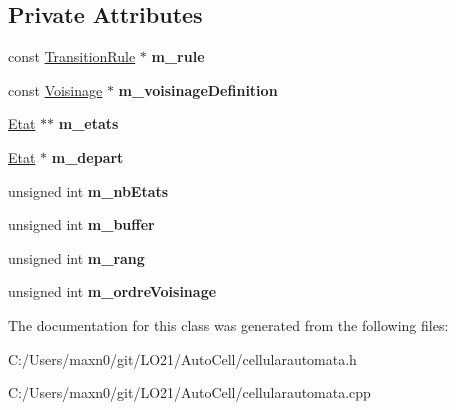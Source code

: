 \subsection*{Private Attributes}
\begin{DoxyCompactItemize}
\item 
\mbox{\label{class_cellular_automata_aac41608d613ea2ee9df3a55ad0a127f6}} 
const \mbox{\hyperlink{class_transition_rule}{Transition\+Rule}} $\ast$ {\bfseries m\+\_\+rule}
\item 
\mbox{\label{class_cellular_automata_a6990374e6bca2e228ff82ad5a3419833}} 
const \mbox{\hyperlink{class_voisinage}{Voisinage}} $\ast$ {\bfseries m\+\_\+voisinage\+Definition}
\item 
\mbox{\label{class_cellular_automata_aed4b142d4bbd1af6ea66db5c4b03cc9d}} 
\mbox{\hyperlink{class_etat}{Etat}} $\ast$$\ast$ {\bfseries m\+\_\+etats}
\item 
\mbox{\label{class_cellular_automata_ae2b6fe299791495f1835bb193b638985}} 
\mbox{\hyperlink{class_etat}{Etat}} $\ast$ {\bfseries m\+\_\+depart}
\item 
\mbox{\label{class_cellular_automata_a75bbb557cc4e2056da5265f242185e0a}} 
unsigned int {\bfseries m\+\_\+nb\+Etats}
\item 
\mbox{\label{class_cellular_automata_a8d2cab9f275061f595fab6a12f8c84d9}} 
unsigned int {\bfseries m\+\_\+buffer}
\item 
\mbox{\label{class_cellular_automata_ac6d05bb0d1a0696c83253257f1047f8e}} 
unsigned int {\bfseries m\+\_\+rang}
\item 
\mbox{\label{class_cellular_automata_ab8cdf5ceb51238136d7ce47ca960f54b}} 
unsigned int {\bfseries m\+\_\+ordre\+Voisinage}
\end{DoxyCompactItemize}


The documentation for this class was generated from the following files\+:\begin{DoxyCompactItemize}
\item 
C\+:/\+Users/maxn0/git/\+L\+O21/\+Auto\+Cell/cellularautomata.\+h\item 
C\+:/\+Users/maxn0/git/\+L\+O21/\+Auto\+Cell/cellularautomata.\+cpp\end{DoxyCompactItemize}
